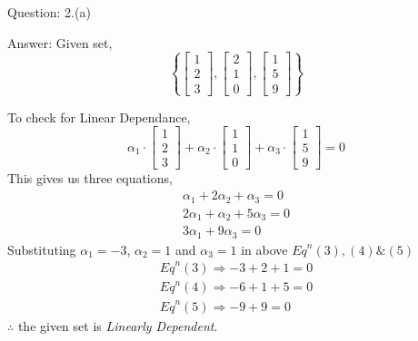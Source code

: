 \documentclass[a4paper]{article}
\begin{document}
\begin{qalist}
		\item[Question: 2.(a)] \setcounter{equation}{0} %
		\item[Answer:] Given set,
			\begin{equation}
				\left\{ \left[\begin{matrix}1 \\ 2 \\ 3\end{matrix}\right], 
					\left[\begin{matrix}2 \\ 1 \\ 0\end{matrix}\right], 
					\left[\begin{matrix}1 \\ 5 \\ 9\end{matrix}\right]
				\right\}
			\end{equation}
			
			To check for Linear Dependance,
			\begin{equation}
				{\alpha}_{1}\cdot\left[\begin{matrix}1 \\ 2 \\ 3\end{matrix}\right] + 
				{\alpha}_{2}\cdot\left[\begin{matrix}1 \\ 1 \\ 0\end{matrix}\right] + 
				{\alpha}_{3}\cdot\left[\begin{matrix}1 \\ 5 \\ 9\end{matrix}\right]
				 = 0
			\end{equation}
			This gives us three equations, 
			\begin{align}
				{\alpha}_{1} + 2{\alpha}_{2} + {\alpha}_{3}= 0 \\
				2{\alpha}_{1} + {\alpha}_{2} + 5{\alpha}_{3}= 0 \\
				3{\alpha}_{1} + 9{\alpha}_{3}= 0
			\end{align}
			Substituting ${\alpha}_{1} = -3$, ${\alpha}_{2} = 1$ and ${\alpha}_{3} = 1$ in above ${Eq}^{n} (3), (4) \& (5)$
			\begin{align}
				{Eq}^{n} (3) \Rightarrow -3 + 2 + 1 = 0 \\
				{Eq}^{n} (4) \Rightarrow -6 + 1 + 5 = 0 \\
				{Eq}^{n} (5) \Rightarrow -9 + 9 = 0
			\end{align}
			$\therefore$ the given set is \textit{Linearly Dependent}. 
			

\end{qalist}
\end{document}
